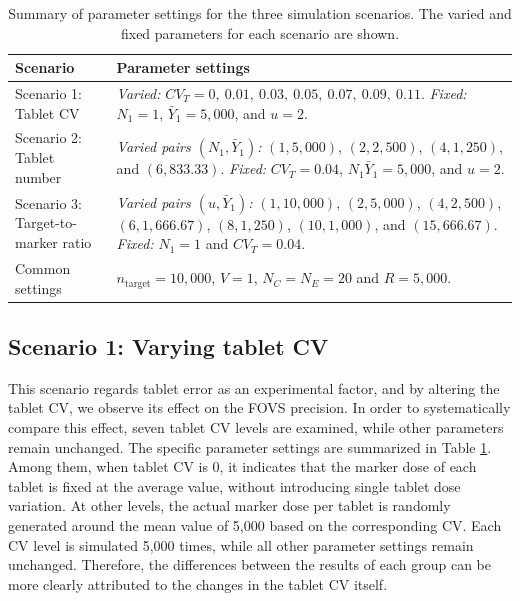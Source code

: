 \documentclass[
  12pt,
]{article}
\begin{document}
\begin{table}[ht!]
\centering
\small
\renewcommand{\arraystretch}{1.5}
\begin{tabular}{
p{}
p{}
}
\hline
\textbf{Scenario} & \textbf{Parameter settings} \\
\hline

Scenario 1: Tablet CV &
\textit{Varied:} $CV_T=0,\ 0.01,\ 0.03,\ 0.05,\ 0.07,\ 0.09,\ 0.11$.
\newline
\textit{Fixed:} $N_1=1$, $\bar{Y}_1=5{,}000$, and $u=2$. \\

\hline

Scenario 2: Tablet number &
\textit{Varied pairs $(N_1,\bar{Y}_1)$:}
$(1,5{,}000)$,
$(2,2{,}500)$,
$(4,1{,}250)$, and
$(6,833.33)$.
\newline
\textit{Fixed:} $CV_T=0.04$, $N_1\bar{Y}_1=5{,}000$, and $u=2$. \\

\hline

Scenario 3: Target-to-marker ratio &
\textit{Varied pairs $(u,\bar{Y}_1)$:}
$(1,10{,}000)$,
$(2,5{,}000)$,
$(4,2{,}500)$,
$(6,1{,}666.67)$,
$(8,1{,}250)$,
$(10,1{,}000)$, and
$(15,666.67)$.
\newline
\textit{Fixed:} $N_1=1$ and $CV_T=0.04$. \\

\hline

Common settings &
$n_{\mathrm{target}}=10{,}000$, $V=1$, $N_C=N_E=20$ and $R=5{,}000$. \\

\hline
\end{tabular}
\caption{\footnotesize Summary of parameter settings for the three simulation scenarios. The varied and fixed parameters for each scenario are shown.}
\label{tab:scenario-settings}
\end{table}

\subsection{Scenario 1: Varying tablet
CV}\label{scenario-1-varying-tablet-cv}

This scenario regards tablet error as an experimental factor, and by
altering the tablet CV, we observe its effect on the FOVS precision. In
order to systematically compare this effect, seven tablet CV levels are
examined, while other parameters remain unchanged. The specific
parameter settings are summarized in Table \ref{tab:scenario-settings}.
Among them, when tablet CV is 0, it indicates that the marker dose of
each tablet is fixed at the average value, without introducing single
tablet dose variation. At other levels, the actual marker dose per
tablet is randomly generated around the mean value of 5,000 based on the
corresponding CV. Each CV level is simulated 5,000 times, while all
other parameter settings remain unchanged. Therefore, the differences
between the results of each group can be more clearly attributed to the
changes in the tablet CV itself.
\end{document}
